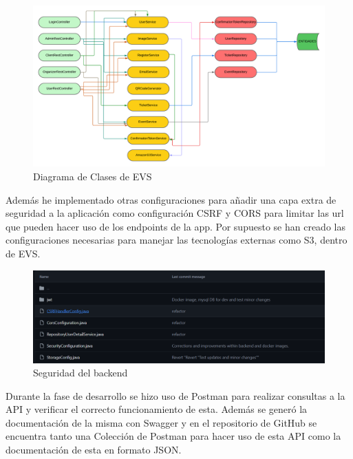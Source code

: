 \begin{figure}[h]
    \centering
    \includegraphics[width=1\textwidth]{DiagramaClases.png} 
    \caption{Diagrama de Clases de EVS}
    \label{fig:class_architecture}
\end{figure}

Además he implementado otras configuraciones para añadir una capa extra de seguridad a la aplicación como configuración CSRF y CORS para limitar las url 
que pueden hacer uso de los endpoints de la app. Por supuesto se han creado las configuraciones necesarias para manejar las tecnologías externas como S3, dentro de 
EVS.

\begin{figure}[h]
    \centering
    \includegraphics[width=1\textwidth]{security.png} 
    \caption{Seguridad del backend}
    \label{fig:securityClasses}
\end{figure}

Durante la fase de desarrollo se hizo uso de Postman para realizar consultas a la API y verificar el correcto funcionamiento de esta. Además se generó la documentación de la
misma con Swagger y en el repositorio de GitHub se encuentra tanto una Colección de Postman para hacer uso de esta API como la documentación de esta en formato JSON.

